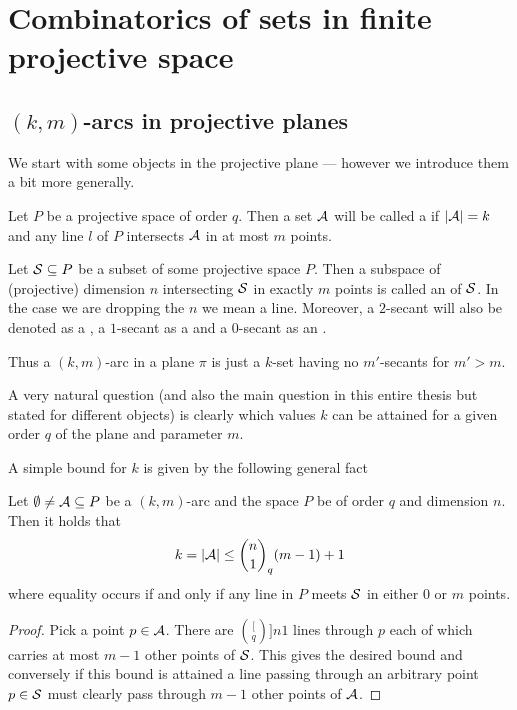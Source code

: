 \section{Combinatorics of sets in finite projective space}\label{sec-combcons}
%
\subsection{$(k,m)$-arcs in projective planes}

We start with some objects in the projective plane --- however we introduce them a bit more generally.

\begin{definition}[$(k,m)$-arc]
    Let $P$ be a projective space of order $q$. Then a set $\mathcal{A}$ will be called a  if $\left\vert{\mathcal{A}}\right\vert=k$ and any line $l$ of
    $P$ intersects $\mathcal{A}$ in at most $m$ points.
\end{definition}

\begin{definition}[$(m,n)$-secant]
    Let $\mathcal{S}\subseteq P$ be a subset of some projective space $P$. Then a subspace of (projective) dimension $n$ intersecting $\mathcal{S}$ in exactly $m$ points is called an  of $\mathcal{S}$. In the case we are dropping the $n$ we mean a line. Moreover, a $2$-secant will also be denoted as a , a $1$-secant as a  and a $0$-secant as an .
\end{definition} 
\begin{remark}
    Thus a $(k,m)$-arc in a plane $\pi$ is just a $k$-set having no $m'$-secants for $m'>m$.
\end{remark}

A very natural question (and also the main question in this entire thesis but stated for different objects) is clearly which values $k$ can be attained for a given order $q$ of the plane and parameter $m$.

A simple bound for $k$ is given by the following general fact

\begin{lemma}\label{kmarc-size}
    Let $\emptyset\neq\mathcal{A}\subseteq P$ be a $(k,m)$-arc and the space $P$ be of order $q$ and dimension $n$.
    Then it holds that
    $$
        k = \card\cA \leq \binom[q]{n}{1}(m-1)+1
    $$
    where equality occurs if and only if any line in $P$ meets $\mathcal{S}$ in either $0$ or $m$ points. 
\end{lemma}
\begin{proof}
    Pick a point $p\in\mathcal{A}$. There are $\binom[q]{n}{1}$ lines through $p$ each of which carries at most $m-1$ other points of $\mathcal{S}$.
    This gives the desired bound and conversely if this bound is attained a line passing through an arbitrary point $p\in \mathcal{S}$ must clearly pass through $m-1$ other points of $\mathcal{A}$.
\end{proof}

